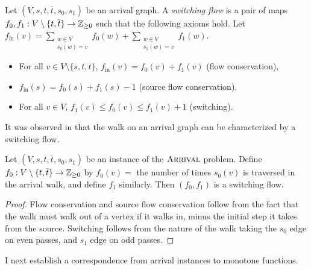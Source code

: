 \newcommand{\fin}{f_{\text{in}}}
\begin{definition}
  Let $(V, s, t, \overline{t}, s_0, s_1)$ be an arrival graph. A \emph{switching flow} is a pair of maps 
  $f_0, f_1 : V \setminus \{t, \overline{t}\} \to \mathbb{Z}_{\geq 0}$ such that the following axioms hold.
    Let $\fin(v) =
        \sum_{\substack{w \in V \\ s_0(w) = v}} f_0(w) 
        + \sum_{\substack{w \in V \\ s_1(w) = v}} f_1(w)$. 
  \begin{itemize}
    \item For all $v \in V \setminus \{s, t, \overline{t}\}$, $\fin(v) = f_0(v) + f_1(v)$ (flow conservation),
    \item $\fin(s) = f_0(s) + f_1(s) - 1$ (source flow conservation),
    \item For all $v \in V$, $f_1(v) \leq f_0(v) \leq f_1(v) + 1$ (switching).
  \end{itemize}
\end{definition}
  It was observed in \citep{arrivalBasic} that the walk on an arrival graph can be characterized
  by a switching flow.
  \begin{lemma}\label{walkSwitching}
    Let $(V, s, t, \overline{t}, s_0, s_1)$ be an instance of the $\textsc{Arrival}$ problem. Define
    $f_0 : V \setminus \{t, \overline{t}\} \to \mathbb{Z}_{\geq 0}$ by $f_0(v) =$ the number of times $s_0(v)$
    is traversed in the arrival walk, and define $f_1$ similarly. Then $(f_0, f_1)$ is a switching
    flow.
  \end{lemma}
  \begin{proof}
    Flow conservation and source flow conservation follow from the fact that the walk must walk
    out of a vertex if it walks in, minus the initial step it takes from the source. Switching
    follows from the nature of the walk taking the $s_0$ edge on even passes, and $s_1$ edge on odd
    passes.
  \end{proof}
  I next establish a correspondence from arrival instances to monotone functions.
